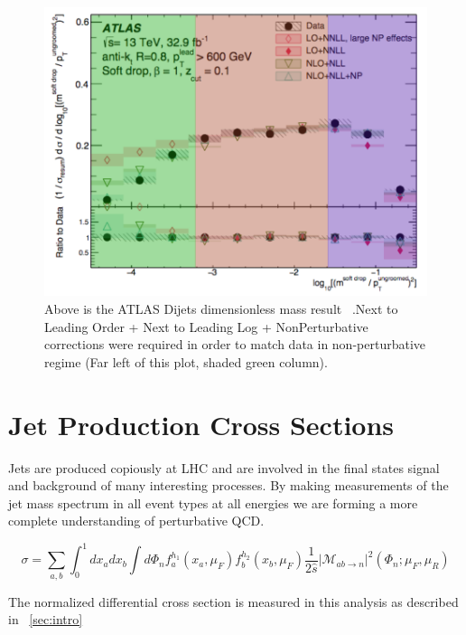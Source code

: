 \begin{figure}[htb]
\centering
\includegraphics[width=.60\textwidth]{visuals/ATLAS-rho-highorder.png}
\caption{Above is the ATLAS Dijets dimensionless mass result ~\cite{Dreyer:2018nbf}.Next to Leading Order + Next to Leading Log + NonPerturbative corrections were required in order to match data in non-perturbative regime (Far left of this plot, shaded green column).}
\label{fig:atlasDijet}
\end{figure}












\section{Jet Production Cross Sections}\label{sec:jetProdCrossSections}

Jets are produced copiously at LHC and are involved in the final states signal and background of many interesting processes. By making measurements of the jet mass spectrum in all event types at all energies we are forming a more complete understanding of perturbative QCD.


\begin{equation}
\sigma=\sum_{a, b} \int_{0}^{1} d x_{a} d x_{b} \int d \Phi_{n} f_{a}^{h_{1}}\left(x_{a}, \mu_{F}\right) f_{b}^{h_{2}}\left(x_{b}, \mu_{F}\right) \frac{1}{2 \hat{s}}\left|\mathcal{M}_{a b \rightarrow n}\right|^{2}\left(\Phi_{n} ; \mu_{F}, \mu_{R}\right)
\end{equation}

The normalized differential cross section is measured in this analysis as described in ~\ref{sec:intro}

